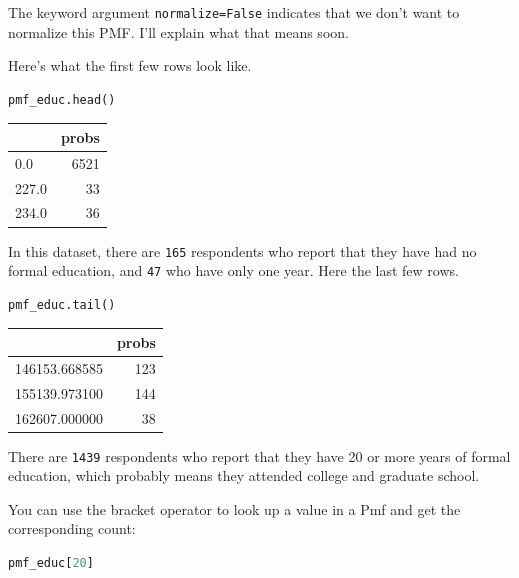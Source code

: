 The keyword argument \passthrough{\lstinline!normalize=False!} indicates
that we don't want to normalize this PMF. I'll explain what that means
soon.

Here's what the first few rows look like.

\begin{lstlisting}[language=Python,style=source]
pmf_educ.head()
\end{lstlisting}

\begin{tabular}{lr}
\toprule
{} &  probs \\
\midrule
0.0   &   6521 \\
227.0 &     33 \\
234.0 &     36 \\
\bottomrule
\end{tabular}

In this dataset, there are \passthrough{\lstinline!165!} respondents who
report that they have had no formal education, and
\passthrough{\lstinline!47!} who have only one year. Here the last few
rows.

\begin{lstlisting}[language=Python,style=source]
pmf_educ.tail()
\end{lstlisting}

\begin{tabular}{lr}
\toprule
{} &  probs \\
\midrule
146153.668585 &    123 \\
155139.973100 &    144 \\
162607.000000 &     38 \\
\bottomrule
\end{tabular}

There are \passthrough{\lstinline!1439!} respondents who report that
they have 20 or more years of formal education, which probably means
they attended college and graduate school.

You can use the bracket operator to look up a value in a Pmf and get the
corresponding count:

\begin{lstlisting}[language=Python,style=source]
pmf_educ[20]
\end{lstlisting}

